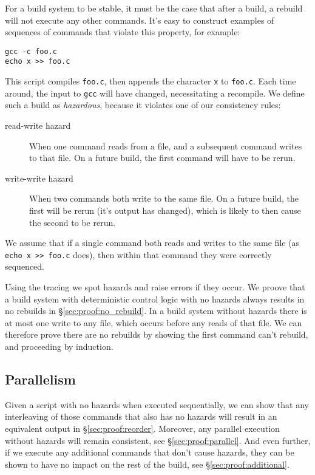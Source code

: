 For a \Make build system to be stable, it must be the case that after a build, a rebuild will not execute any other commands. It's easy to construct examples of sequences of commands that violate this property, for example:

\begin{verbatim}
gcc -c foo.c
echo x >> foo.c
\end{verbatim}

This script compiles \texttt{foo.c}, then appends the character \texttt{x} to \texttt{foo.c}. Each time around, the input to \texttt{gcc} will have changed, necessitating a recompile. We define such a build as \emph{hazardous}, because it violates one of our consistency rules:

\begin{description}
\item[read-write hazard] When one command reads from a file, and a subsequent command writes to that file. On a future build, the first command will have to be rerun.
\item[write-write hazard] When two commands both write to the same file. On a future build, the first will be rerun (it's output has changed), which is likely to then cause the second to be rerun.
\end{description}

We assume that if a single command both reads and writes to the same file (as \texttt{echo x >> foo.c} does), then within that command they were correctly sequenced.

Using the tracing we spot hazards and raise errors if they occur. We proove that a build system with deterministic control logic with no hazards always results in no rebuilds in \S\ref{sec:proof:no_rebuild}. In a build system without hazards there is at most one write to any file, which occurs before any reads of that file. We can therefore prove there are no rebuilds by showing the first command can't rebuild, and proceeding by induction.

\subsection{Parallelism}

Given a script with no hazards when executed sequentially, we can show that any interleaving of those commands that also has no hazards will result in an equivalent output in \S\ref{sec:proof:reorder}. Moreover, any parallel execution without hazards will remain consistent, see \S\ref{sec:proof:parallel}. And even further, if we execute any additional commands that don't cause hazards, they can be shown to have no impact on the rest of the build, see \S\ref{sec:proof:additional}.

